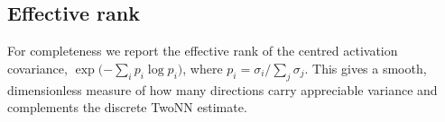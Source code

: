 \subsection{Effective rank}
For completeness we report the effective rank of the centred activation
covariance, $\exp\!\big({-\sum_i p_i\log p_i}\big)$, where $p_i = \sigma_i/\sum_j\sigma_j$.
This gives a smooth, dimensionless measure of how many directions carry
appreciable variance and complements the discrete TwoNN estimate.
